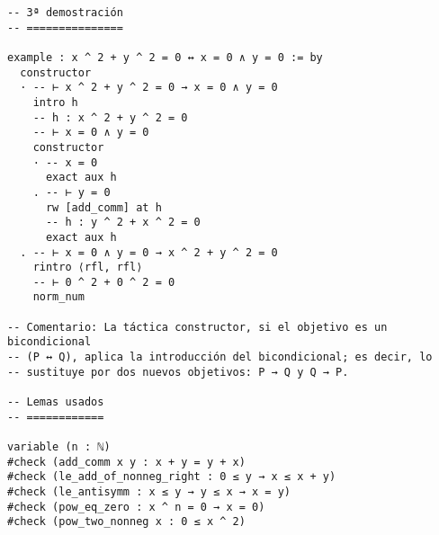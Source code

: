 \begin{verbatim}
-- 3ª demostración
-- ===============

example : x ^ 2 + y ^ 2 = 0 ↔ x = 0 ∧ y = 0 := by
  constructor
  · -- ⊢ x ^ 2 + y ^ 2 = 0 → x = 0 ∧ y = 0
    intro h
    -- h : x ^ 2 + y ^ 2 = 0
    -- ⊢ x = 0 ∧ y = 0
    constructor
    · -- x = 0
      exact aux h
    . -- ⊢ y = 0
      rw [add_comm] at h
      -- h : y ^ 2 + x ^ 2 = 0
      exact aux h
  . -- ⊢ x = 0 ∧ y = 0 → x ^ 2 + y ^ 2 = 0
    rintro ⟨rfl, rfl⟩
    -- ⊢ 0 ^ 2 + 0 ^ 2 = 0
    norm_num

-- Comentario: La táctica constructor, si el objetivo es un bicondicional
-- (P ↔ Q), aplica la introducción del bicondicional; es decir, lo
-- sustituye por dos nuevos objetivos: P → Q y Q → P.

-- Lemas usados
-- ============

variable (n : ℕ)
#check (add_comm x y : x + y = y + x)
#check (le_add_of_nonneg_right : 0 ≤ y → x ≤ x + y)
#check (le_antisymm : x ≤ y → y ≤ x → x = y)
#check (pow_eq_zero : x ^ n = 0 → x = 0)
#check (pow_two_nonneg x : 0 ≤ x ^ 2)
\end{verbatim}

